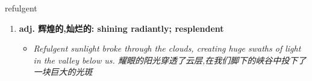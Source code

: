 
\begin{frame}
{\huge refulgent}
\begin{center}
\begin{enumerate}\Large
  \item \textbf{adj. 辉煌的,灿烂的: shining radiantly; resplendent}
  \begin{itemize}
    \item \em{\Large{Refulgent sunlight broke through the clouds, creating huge swaths of light in the valley below us. 耀眼的阳光穿透了云层,在我们脚下的峡谷中投下了一块巨大的光斑}}
  \end{itemize}
\end{enumerate}
\end{center}
\end{frame}
